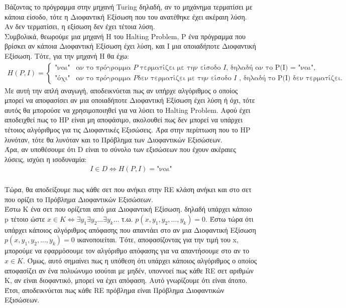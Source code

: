 \documentclass{article}
\begin{document}
\begin{enumerate}[label=(\alph*)]
Βάζοντας το πρόγραμμα στην μηχανή Turing δηλαδή, αν το μηχάνημα τερματίσει με κάποια είσοδο, τότε η Διοφαντική Εξίσωση που του ανατέθηκε έχει ακέραιη λύση. Αν δεν τερματίσει, η εξίσωση δεν έχει τέτοια λύση. 
\\
Συμβολικά, θεωρούμε μια μηχανή H του Halting Problem, P ένα πρόγραμμα που βρίσκει αν κάποια Διοφαντική Εξίσωση έχει λύση, και Ι μια οποιαδήποτε Διοφαντική Εξίσωση. Τότε, για την μηχανή Η θα έχω:
\begin{align*}
H(P,I) = 
\begin{cases} 
\text{"ναι"} & \text{αν το πρόγραμμα } P \text{ τερματίζει με την είσοδο } I \text{, δηλαδή αν το P(I) = "ναι"}, \\
\text{"όχι"} & \text{αν το πρόγραμμα } P \text{δεν τερματίζει με την είσοδο } I \text{ , δηλαδή το P(I) δεν τερματίζει}. 
\end{cases}
\end{align*}
Με αυτή την απλή αναγωγή, αποδεικνύεται πως αν υπήρχε αλγόριθμος ο οποίος μπορεί να αποφασίσει αν μια οποιαδήποτε Διοφαντική Εξίσωση έχει λύση ή όχι, τότε αυτός θα μπορούσε να χρησιμοποιηθεί για να λύσει το Halting Problem. Αφού έχει αποδειχθεί πως το HP είναι μη αποφάσιμο, ακολουθεί πως δεν μπορεί να υπάρχει τέτοιος αλγόριθμος για τις Διοφαντικές Εξισώσεις. Άρα στην περίπτωση που το HP λυνόταν, τότε θα λυνόταν και το Πρόβλημα των Διοφαντικών Εξισώσεων.
\\
Άρα, αν υποθέσουμε ότι D είναι το σύνολο των εξισώσεων που έχουν ακέραιες λύσεις, ισχύει η ισοδυναμία:
\\
\begin{align*}
I \in  D \iff H(P,I) = \text{"ναι"}
\end{align*}
\\
Τώρα, θα αποδείξουμε πως κάθε σετ που ανήκει στην RE κλάση ανήκει και στο σετ που ορίζει το Πρόβλημα Διοφαντικών Εξισώσεων. \\
Έστω Κ ένα σετ που ορίζεται από μια Διοφαντική Εξίσωση. δηλαδή υπάρχει κάποιο p τέτοιο ώστε $x \in K \iff \exists y_1 \exists y_2 ... \exists y_k \ldots$ τ.ω. $p(x, y_1, y_2, ...,y_k)=0$. Έστω τώρα ότι υπάρχει κάποιος αλγόριθμος απόφασης που απαντάει στο αν μια Διοφαντική Εξίσωση $p(x, y_1, y_2, ...,y_k)=0$ ικανοποιείται. Τότε, αποφασίζοντας για την τιμή του x, μπορούμε να εφαρμόσουμε τον αλγόριθμο απόφασης για να απαντήσουμε στο αν το $x \in K$. Όμως, αυτό σημαίνει πως η υπόθεση ότι υπάρχει κάποιος αλγόριθμος ο οποίος αποφασίζει αν ένα πολυώνυμο ισούται με μηδέν, υποννοεί πως κάθε RE σετ αριθμών Κ, αν είναι διοφαντικό, μπορεί να έχει απόφαση. Αυτό γνωρίζουμε ότι είναι άτοπο. Έτσι, αποδεικνύεται πως κάθε RE πρόβλημα είναι Πρόβλημα Διοφαντικών Εξισώσεων. 

\end{enumerate}
\end{document}
